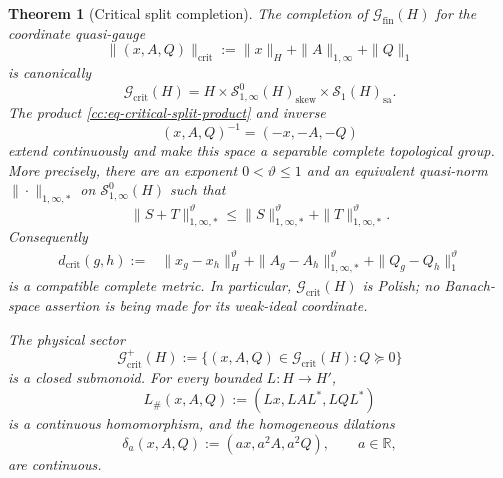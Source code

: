 \documentclass[10pt,reqno]{amsart}
\theoremstyle{plain}
\newtheorem{theorem}{Theorem}[section]
\theoremstyle{definition}
\theoremstyle{remark}
\begin{document}
\begin{theorem}[Critical split completion]
\label{cc:thm-critical-split-completion}
The completion of \(\mathscr G_{\mathrm{fin}}(H)\) for the coordinate
quasi-gauge
\begin{equation}
 \|(x,A,Q)\|_{\mathrm{crit}}
 :=\|x\|_H+\|A\|_{1,\infty}+\|Q\|_1
 \label{cc:eq-critical-quasi-gauge}
\end{equation}
is canonically
\begin{equation}
 \mathscr G_{\mathrm{crit}}(H)
 =H\times\mathcal S^0_{1,\infty}(H)_{\mathrm{skew}}
       \times\mathcal S_1(H)_{\mathrm{sa}}.
 \label{cc:eq-critical-split-space}
\end{equation}
The product \eqref{cc:eq-critical-split-product} and inverse
\[
 (x,A,Q)^{-1}=(-x,-A,-Q)
\]
extend continuously and make this space a separable complete topological
group.  More precisely, there are an exponent
\(0<\vartheta\leq1\) and an equivalent quasi-norm
\(\|\cdot\|_{1,\infty,*}\) on
\(\mathcal S^0_{1,\infty}(H)\) such that
\[
 \|S+T\|_{1,\infty,*}^{\vartheta}
 \leq \|S\|_{1,\infty,*}^{\vartheta}
      +\|T\|_{1,\infty,*}^{\vartheta}.
\]
Consequently
\begin{align}
 d_{\mathrm{crit}}(g,h)
 :={}&\|x_g-x_h\|_H^{\vartheta}
 +\|A_g-A_h\|_{1,\infty,*}^{\vartheta}
 +\|Q_g-Q_h\|_1^{\vartheta}
 \label{cc:eq-critical-Aoki-metric}
\end{align}
is a compatible complete metric.  In particular,
\(\mathscr G_{\mathrm{crit}}(H)\) is Polish; no Banach-space assertion is
being made for its weak-ideal coordinate.

The physical sector
\begin{equation}
 \mathscr G^+_{\mathrm{crit}}(H)
 :=\{(x,A,Q)\in\mathscr G_{\mathrm{crit}}(H):Q\succeq0\}
 \label{cc:eq-critical-positive-sector}
\end{equation}
is a closed submonoid.  For every bounded \(L:H\to H'\),
\[
 L_{\#}(x,A,Q):=(Lx,LAL^*,LQL^*)
\]
is a continuous homomorphism, and the homogeneous dilations
\[
 \delta_a(x,A,Q):=(ax,a^2A,a^2Q),\qquad a\in\mathbb R,
\]
are continuous.
\end{theorem}
\end{document}
